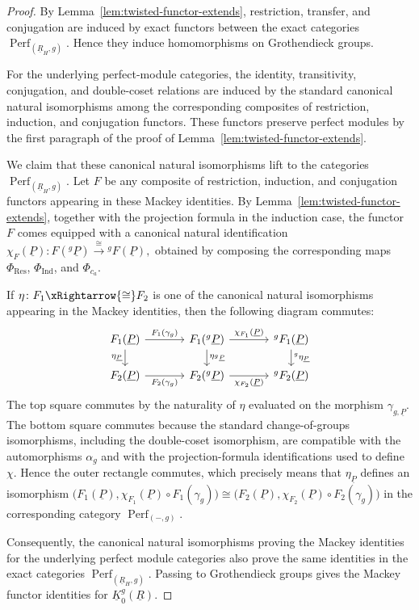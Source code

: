 \documentclass[11pt,oneside]{amsart}
\numberwithin{equation}{section}
\numberwithin{figure}{section}
\theoremstyle{plain}
\theoremstyle{definition}
\theoremstyle{remark}
\begin{document}
\begin{proof}
By Lemma~\ref{lem:twisted-functor-extends}, restriction, transfer, and
conjugation are induced by exact functors between the exact categories \(\operatorname{Perf}_{(\underline R_H,g)}\). Hence they induce homomorphisms on
Grothendieck groups.

For the underlying perfect-module categories, the identity, transitivity,
conjugation, and double-coset relations are induced by the standard
canonical natural isomorphisms among the corresponding composites of
restriction, induction, and conjugation functors. These functors preserve
perfect modules by the first paragraph of the proof of
Lemma~\ref{lem:twisted-functor-extends}.

We claim that these canonical natural isomorphisms lift to the categories
\(\operatorname{Perf}_{(\underline R_H,g)}\). Let \(F\) be any composite of
restriction, induction, and conjugation functors appearing in these
Mackey identities. By Lemma~\ref{lem:twisted-functor-extends}, together
with the projection formula in the induction case, the functor \(F\)
comes equipped with a canonical natural identification
\(
\chi_F(\underline P)\colon
F({}^g\underline P)\xrightarrow{\cong}{}^gF(\underline P),
\)
obtained by composing the corresponding maps
\(\Phi_{\operatorname{Res}}\), \(\Phi_{\operatorname{Ind}}\), and
\(\Phi_{c_a}\).


If \(\eta\colon F_1\xRightarrow{\cong}F_2\) is one of the canonical
natural isomorphisms appearing in the Mackey identities, then the following diagram commutes:
\[\begin{tikzcd}[column sep=3.5em, row sep=1.5em]
F_1(\underline P) 
  \ar[r,"F_1(\gamma_{g})"] 
  \ar[d,"\eta_{\underline P}"'] 
& 
F_1({}^g\underline P) 
  \ar[r,"\chi_{F_1}(\underline P)"] 
  \ar[d,"\eta_{{}^g\underline P}"] 
& 
{}^gF_1(\underline P) 
  \ar[d,"{}^g\eta_{\underline P}"] 
\\
F_2(\underline P) 
  \ar[r,"F_2(\gamma_{g})"'] 
& 
F_2({}^g\underline P) 
  \ar[r,"\chi_{F_2}(\underline P)"'] 
& 
{}^gF_2(\underline P)
\end{tikzcd}\]
The top square commutes by the naturality of \(\eta\) evaluated on the
morphism \(\gamma_{g,\underline P}\). The bottom square commutes because
the standard change-of-groups isomorphisms, including the double-coset
isomorphism, are compatible with the automorphisms \(\alpha_g\) and with
the projection-formula identifications used to define \(\chi\). Hence the
outer rectangle commutes, which precisely means that
\(\eta_{\underline P}\) defines an isomorphism
\(
\bigl(F_1(\underline P),
\chi_{F_1}(\underline P)\circ F_1(\gamma_{g})\bigr)
\cong
\bigl(F_2(\underline P),
\chi_{F_2}(\underline P)\circ F_2(\gamma_{g})\bigr)
\)
in the corresponding category \(\operatorname{Perf}_{(-,g)}\).

Consequently, the canonical natural isomorphisms proving the Mackey
identities for the underlying perfect module categories also prove the
same identities in the exact categories
\(\operatorname{Perf}_{(\underline R_H,g)}\). Passing to Grothendieck
groups gives the Mackey functor identities for
\(\underline K_0^g(\underline R)\).
\end{proof}
\end{document}
